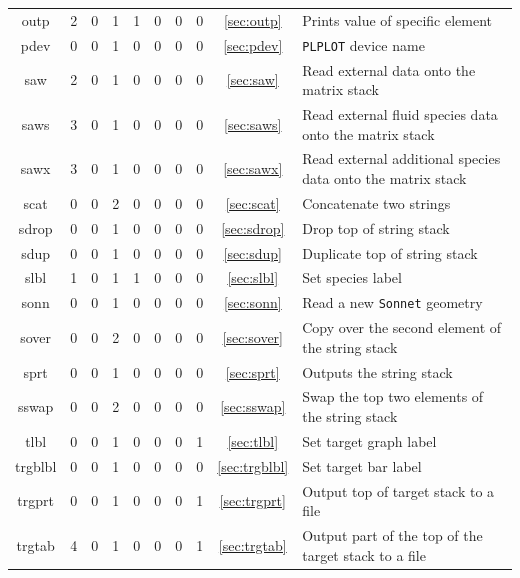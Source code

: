 \documentclass[a4paper,10pt]{report}
\begin{document}
\begin{center}
\begin{longtable}{|c|c|c|c|c|c|c|c|c|l|}
    outp \index{b2plot, outp}    & 2 & 0 & 1 & 1 & 0 & 0 & 0 & \ref{sec:outp}     & Prints value of specific element \\
    pdev \index{b2plot, pdev}    & 0 & 0 & 1 & 0 & 0 & 0 & 0 & \ref{sec:pdev}     & {\tt PLPLOT} device name \\
    saw \index{b2plot, saw}      & 2 & 0 & 1 & 0 & 0 & 0 & 0 & \ref{sec:saw}      & Read external data onto the matrix stack \\
    saws \index{b2plot, saws}    & 3 & 0 & 1 & 0 & 0 & 0 & 0 & \ref{sec:saws}     & Read external fluid species data onto the matrix stack \\
    sawx \index{b2plot, sawx}    & 3 & 0 & 1 & 0 & 0 & 0 & 0 & \ref{sec:sawx}     & Read external additional species data onto the matrix stack \\
    scat \index{b2plot, scat}    & 0 & 0 & 2 & 0 & 0 & 0 & 0 & \ref{sec:scat}     & Concatenate two strings \\
    sdrop \index{b2plot, sdrop}  & 0 & 0 & 1 & 0 & 0 & 0 & 0 & \ref{sec:sdrop}    & Drop top of string stack \\
    sdup \index{b2plot, sdup}    & 0 & 0 & 1 & 0 & 0 & 0 & 0 & \ref{sec:sdup}     & Duplicate top of string stack \\
    slbl \index{b2plot, slbl}    & 1 & 0 & 1 & 1 & 0 & 0 & 0 & \ref{sec:slbl}     & Set species label \\
    sonn \index{b2plot, sonn}    & 0 & 0 & 1 & 0 & 0 & 0 & 0 & \ref{sec:sonn}     & Read a new {\tt Sonnet} geometry \\
    sover \index{b2plot, sover}  & 0 & 0 & 2 & 0 & 0 & 0 & 0 & \ref{sec:sover}    & Copy over the second element of the string stack \\
    sprt \index{b2plot, sprt}    & 0 & 0 & 1 & 0 & 0 & 0 & 0 & \ref{sec:sprt}     & Outputs the string stack \\
    sswap \index{b2plot, sswap}  & 0 & 0 & 2 & 0 & 0 & 0 & 0 & \ref{sec:sswap}    & Swap the top two elements of the string stack \\
    tlbl \index{b2plot, tlbl}    & 0 & 0 & 1 & 0 & 0 & 0 & 1 & \ref{sec:tlbl}     & Set target graph label \\
    trgblbl \index{b2plot, trgblbl} & 0 & 0 & 1 & 0 & 0 & 0 & 0 & \ref{sec:trgblbl}  & Set target bar label \\
    trgprt \index{b2plot, trgprt} & 0 & 0 & 1 & 0 & 0 & 0 & 1 & \ref{sec:trgprt}     & Output top of target stack to a file \\
    trgtab \index{b2plot, trgtab} & 4 & 0 & 1 & 0 & 0 & 0 & 1 & \ref{sec:trgtab}     & Output part of the top of the target stack to a file \\

\end{longtable}
\end{center}
\end{document}
